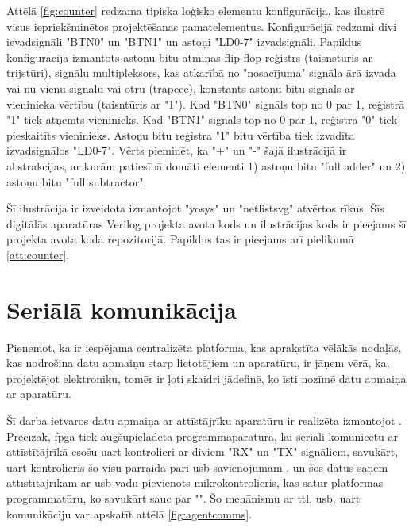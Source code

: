 Attēlā \ref{fig:counter} redzama tipiska loģisko elementu konfigurācija, kas
ilustrē visus iepriekšminētos projektēšanas pamatelementus. Konfigurācijā
redzami divi ievadsignāli "BTN0" un "BTN1" un astoņi "LD{0-7}" izvadsignāli.
Papildus konfigurācijā izmantots astoņu bitu atmiņas flip-flop reģistrs
(taisnstūris ar trijstūri), signālu multipleksors, kas atkarībā no "nosacījuma"
signāla ārā izvada vai nu vienu signālu vai otru (trapece), konstants astoņu
bitu signāls ar vieninieka vērtību (taisntūris ar "1"). Kad "BTN0" signāls top
no 0 par 1, reģistrā "1" tiek atņemts vieninieks. Kad "BTN1" signāls top no 0
par 1, reģistrā "0" tiek pieskaitīts vieninieks. Astoņu bitu reģistra "1" bitu
vērtība tiek izvadīta izvadsignālos "LD{0-7}". Vērts pieminēt, ka "+" un "-"
šajā ilustrācijā ir abstrakcijas, ar kurām patiesībā domāti elementi 1) astoņu
bitu "full adder" un 2) astoņu bitu "full subtractor".

Šī ilustrācija ir izveidota izmantojot "yosys" un "netlistsvg" atvērtos rīkus.
Šīs digitālās aparatūras Verilog projekta avota kods un ilustrācijas kods ir
pieejams šī projekta avota koda repozitorijā. \cite{VeinbahsKrisjanisTestbed}
Papildus tas ir pieejams arī pielikumā \ref{att:counter}.

\section{Seriālā komunikācija}
\label{sec:serial}

Pieņemot, ka ir iespējama centralizēta platforma, kas aprakstīta vēlākās
nodaļās, kas nodrošina datu apmaiņu starp lietotājiem un aparatūru, ir jāņem
vērā, ka, projektējot elektroniku, tomēr ir ļoti skaidri jādefinē, ko īsti
nozīmē datu apmaiņa ar aparatūru.

Šī darba ietvaros datu apmaiņa ar attīstājrīku aparatūru ir realizēta izmantojot
. Precīzāk, \gls{fpga} tiek
augšupielādēta programmaparatūra, lai seriāli komunicētu ar attīstītājrīkā esošu
\gls{uart} kontrolieri ar diviem "RX" un "TX" signāliem, savukārt,
\gls{uart} kontrolieris šo visu pārraida pāri \gls{usb} savienojumam
\cite[para. USB-UART Bridge]{DigilentAnvylReference}, un šos datus saņem
attīstītājrīkam ar \gls{usb} vadu pievienots mikrokontrolieris, kas satur
platformas programmatūru, ko savukārt sauc par "". Šo
mehānismu ar \gls{ttl}, \gls{usb}, \gls{uart} komunikāciju var
apskatīt attēlā \ref{fig:agentcomms}.


